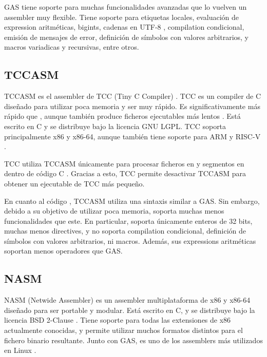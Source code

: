 
GAS tiene soporte para muchas funcionalidades avanzadas que lo vuelven un
\gls{assembler} muy flexible. Tiene soporte para etiquetas locales, evaluación
de \gls{expression} aritméticas, \glspl{bigint}, cadenas en UTF-8
\parencite{UTF-8}, \gls{compilation} condicional, emisión de mensajes de error,
definición de símbolos con valores arbitrarios, y macros variadicas y
recursivas, entre otros.

\subsection{TCCASM}

TCCASM es el \gls{assembler} de TCC (Tiny C Compiler) \parencite{tcc}. TCC es un
\gls{compiler} de C diseñado para utilizar poca memoria y ser muy rápido. Es
significativamente más rápido  que
, aunque también produce ficheros ejecutables más lentos
\parencite{tcc-speed}. Está escrito en C y se distribuye bajo la licencia GNU
LGPL. TCC soporta principalmente x86 y x86-64, aunque también tiene soporte para
ARM y RISC-V \parencite{tcc-manual} \parencite{tcc-arm} \parencite{tcc-riscv}.

TCC utiliza TCCASM únicamente para procesar ficheros en
 y segmentos en 
dentro de código C \parencite{tcc-manual}. Gracias a esto, TCC permite
desactivar TCCASM para obtener un ejecutable de TCC más pequeño.

En cuanto al código , TCCASM utiliza una sintaxis
similar a GAS. Sin embargo, debido a su objetivo de utilizar poca memoria,
soporta muchas menos funcionalidades que este. En particular, soporta únicamente
enteros de 32 bits, muchas menos \glspl{directive}, y no soporta
\gls{compilation} condicional, definición de símbolos con valores arbitrarios,
ni macros. Además, sus \glspl{expression} aritméticas soportan menos operadores
que GAS.

\subsection{NASM}

NASM (Netwide Assembler) \parencite{NASM} es un \gls{assembler} multiplataforma
de x86 y x86-64 diseñado para ser portable y modular. Está escrito en C, y se
distribuye bajo la licencia BSD 2-Clause \parencite{bsd-2c}. Tiene soporte para
todas las extensiones de x86 actualmente conocidas, y permite utilizar muchos
formatos distintos para el fichero binario resultante. Junto con GAS, es uno de
los \glspl{assembler} más utilizados en Linux \parencite{assembler-usage}.


